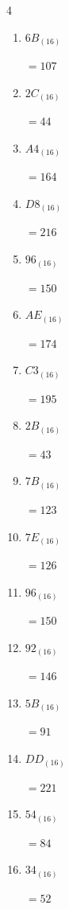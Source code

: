 \begin{multicols}{4}
\begin{enumerate}
        $=208$

  \item $6B_{(16)}$

        $=107$

  \item $2C_{(16)}$

        $=44$

  \item $A4_{(16)}$

        $=164$

  \item $D8_{(16)}$

        $=216$

  \item $96_{(16)}$

        $=150$

\columnbreak %

  \item $AE_{(16)}$

        $=174$

  \item $C3_{(16)}$

        $=195$

  \item $2B_{(16)}$

        $=43$

  \item $7B_{(16)}$

        $=123$

  \item $7E_{(16)}$

        $=126$

  \item $96_{(16)}$

        $=150$

  \item $92_{(16)}$

        $=146$

  \item $5B_{(16)}$

        $=91$

  \item $DD_{(16)}$

        $=221$

  \item $54_{(16)}$

        $=84$

  \item $34_{(16)}$

        $=52$


\end{enumerate}
\end{multicols}
